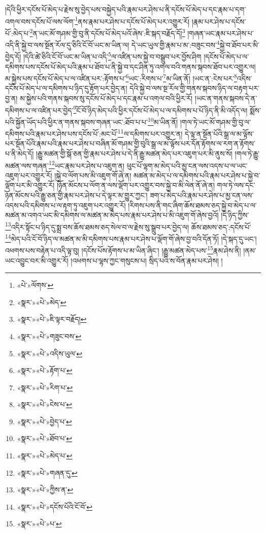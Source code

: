 །དེའི་ཕྱིར་དངོས་པོ་མེད་པ་རྗེས་སུ་བྱེད་པས་བསྐྱེད་པའི་རྣམ་པར་ཤེས་པ་ནི་དངོས་པོ་མེད་པ་དང་རྣམ་པ་དག་འགལ་བས་དངོས་པོ་ལས་ལོག་\footnote{«པེ་»ལོགས་}ནས་རྣམ་པར་ཤེས་པ་དངོས་པོ་མེད་པར་འགྱུར་རོ། །རྣམ་པར་ཤེས་པ་དངོས་པོ་:མེད་པ་\footnote{«སྣར་»«པེ་»མེད་}ན་ཡང་མོ་གཤམ་གྱི་བུ་ནི་དངོས་པོ་མེད་པའོ་ཞེས་:ཇི་སྐད་བརྗོད་དོ།\footnote{«སྣར་»«པེ་»ཇི་ལྟར་བརྗོད།} །གཞན་ཡང་རྣམ་པར་ཤེས་པ་འདི་ནི་སྐྱེ་བ་ལས་སྔོན་རོལ་དུ་ཅིའི་ངོ་བོ་ཡང་མ་ཡིན་ལ། དེ་ཡང་ཡུལ་གྱི་རྣམ་པ་མ་:བཟུང་བས་\footnote{«སྣར་»«པེ་»གཟུང་བས་}སྐྱེ་བ་ཐོབ་པར་མི་བྱེད་དོ། །དེའི་ཚེ་ཅིའི་ངོ་བོ་ཡང་མ་ཡིན་པ་འདི་\footnote{«སྣར་»«པེ་»འདིས་ཡུལ་}ལ་འཛིན་པས་སྐྱེ་བ་བསྒྲུབ་པར་བྱོས་ཤིག །དངོས་པོ་མེད་པ་ལ་དམིགས་པས་དངོས་པོ་མེད་པའི་རྣམ་པ་ཐོབ་པ་ནི་སྐྱེ་བ་དང་ཤིན་ཏུ་འགལ་བའི་གནས་སྐབས་ཐོབ་པར་འགྱུར་ལ། མ་སྐྱེས་པས་དངོས་པོ་མེད་པ་ལ་འཛིན་པར་:རྟོགས་པ་\footnote{«སྣར་»«པེ་»རྟོག་པ་}ཡང་:རིགས་པ་\footnote{«སྣར་»«པེ་»རིག་པ་}མ་ཡིན་ནོ། །ཡང་ན་:ངེས་པར་\footnote{«སྣར་»«པེ་»ངེས་པ་}འདིས་དངོས་པོ་མེད་པ་ལ་དམིགས་པ་ཉིད་དུ་རྟོག་པར་བྱེད་ན། དེའི་སྐྱེ་བ་ལས་སྔ་རོལ་གྱི་གནས་སྐབས་ཉིད་ལ་བརྟག་པར་བྱ་ན། མ་སྐྱེས་པའི་གནས་སྐབས་སུ་དངོས་པོ་མེད་པ་དང་རྣམ་པ་འགལ་བའི་ཕྱིར་རོ། །ཡང་ན་གནས་སྐབས་དེ་ན་དམིགས་པ་ལ་འཛིན་པར་བྱེད་\footnote{«སྣར་»«པེ་»བྱེད་པ་}ངོ་བོ་ཉིད་མེད་པའི་ཕྱིར་དངོས་པོ་མེད་པ་ལ་དམིགས་པ་པོ་ཉིད་ནི་མི་འདོད་ལ། སྨོས་པའི་སྐྱོན་ཡོད་པའི་ཕྱིར་ན་གནས་སྐབས་གཞན་ཡང་:ཐོབ་པ་པ་\footnote{«སྣར་»«པེ་»ཐོབ་པ་}མ་ཡིན་ནོ། །གལ་ཏེ་ཡང་མོ་གཤམ་གྱི་བུ་ལ་དམིགས་པའི་རྣམ་པར་ཤེས་པས་དངོས་པོ་:མང་པོ་\footnote{«སྣར་»«པེ་»མེད་པ་}ལ་དམིགས་པར་འགྱུར་ན། དེ་ལྟ་ན་སྔོན་པོའི་སྒྲ་ལ་མ་ལྟོས་པར་སྔོན་པོའི་རྣམ་པའི་རྣམ་པར་ཤེས་པ་བཞིན་མོ་གཤམ་གྱི་བུའི་སྒྲ་ལ་མ་ལྟོས་པར་དོན་རྟོགས་ལ་རག་ན་རྟོགས་པ་ནི་མེད་དོ། །རྒྱུ་མཚན་གྱི་སྒོ་ཅན་གྱི་རྣམ་པར་ཤེས་པ་དེ་ནི་རྒྱུ་མཚན་མེད་པར་འཇུག་པར་མི་ནུས་སོ། །གལ་ཏེ་རྒྱུ་མཚན་ལས་གཞན་\footnote{«སྣར་»«པེ་»གཞན་དུ་}ཡང་རྣམ་པར་ཤེས་པ་འཇུག་ན། ཕུང་པོ་ལྷག་མ་མེད་པའི་མྱ་ངན་ལས་འདས་པ་ལ་ཡང་འཇུག་པར་འགྱུར་རོ། །སྐྱེ་བ་ལོག་པས་མི་འཇུག་གོ་ཞེ་ན། མཚན་མ་མེད་པ་ལ་དམིགས་པའི་རྣམ་པར་ཤེས་པ་སྐྱེ་བ་ལྡོག་པར་མི་འགྱུར་རོ། །ཉོན་མོངས་པ་ལོག་ན་ལས་ལྡོག་པར་འགྱུར་བས་སྐྱེ་བ་མི་ལེན་ནོ་ཞེ་ན། གལ་ཏེ་ལས་དང་ཉོན་མོངས་པའི་རྒྱུ་ཅན་གྱི་རྣམ་པར་ཤེས་པ་དེ་ལྟར་མ་གྱུར་ཀྱང་། ཟག་པ་མེད་པའི་རྣམ་པར་ཤེས་པ་མྱ་ངན་ལས་འདས་པའི་དམིགས་པ་ལ་རྟག་ཏུ་འཇུག་པར་འགྱུར་རོ། །རིགས་པས་ནི་གང་ཞིག་ཆོས་ཐམས་ཅད་སྐྱེ་བ་མེད་པ་ལ་མཚན་མ་འགའ་ཡང་མི་དམིགས་ལ་མཚན་མ་མེད་པས་རྣམ་པར་ཤེས་པ་མི་འཇུག་གོ་ཞེས་བྱའོ། །དེ་ཉིད་ཀྱིས་\footnote{«སྣར་»«པེ་»ཀྱིས་ན་}འདིར་སྟོང་པ་ཉིད་དུ་སྨྲ་བས་ཆོས་ཐམས་ཅད་སེལ་བ་ལ་རྗེས་སུ་སྒྲུབ་པར་བྱེད་ལ། ཆོས་ཐམས་ཅད་:དངོས་པོ་\footnote{«སྣར་»«པེ་»དངོས་པོའི་ངོ་བོ་}མེད་པའི་ངོ་བོ་ཉིད་ལ་མཚན་མ་མི་དམིགས་པས་རྣམ་པར་ཤེས་པ་ལྡོག་གོ་ཞེས་བྱ་བའི་དོན་ཏོ། །དེ་སྐད་དུ་ཡང་། འཕགས་པས་བརྟེན་པ་འདི་ལྟ་བུ། །དངོས་པོས་རྟོགས་པ་མ་ཡིན་ཞིང་། །རྒྱུ་མཚན་མེད་པས་\footnote{«སྣར་»«པེ་»པ་}རྣམ་ཤེས་ནི། །ནམ་ཡང་འབྱུང་བར་མི་འགྱུར་རོ། །འཕགས་པ་ལྷས་ཀྱང་གསུངས་པ། སྲིད་པའི་ས་བོན་རྣམ་པར་ཤེས། །
